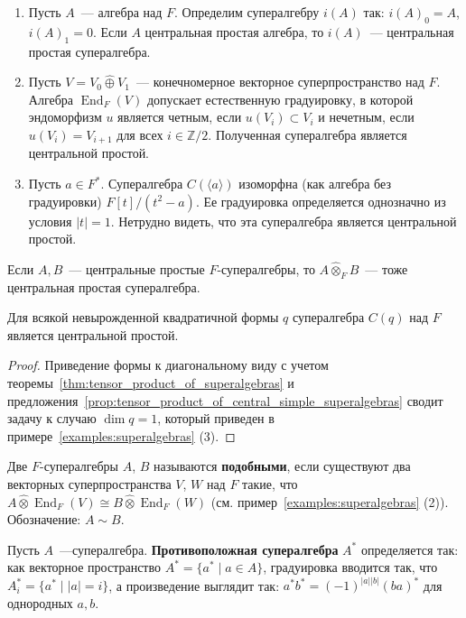 \documentclass[a4paper,oneside,12pt]{article}
\theoremstyle{plain} { \swapnumbers
\newtheorem{theorem}{Теорема}[subsection]
\newtheorem{corollary}[theorem]{Следствие}
\newtheorem{lemma}[theorem]{Лемма}
\newtheorem{proposition}[theorem]{Утверждение}
\newtheorem{claim}[theorem]{Факт}
}
\theoremstyle{definition} { \swapnumbers
\newtheorem{definition}[theorem]{Определение}
\newtheorem{notation}[theorem]{Обозначение}
\newtheorem{remark}[theorem]{Замечание}
\newtheorem{remarks}[theorem]{Замечания}
\newtheorem{example}[theorem]{Пример}
\newtheorem{examples}[theorem]{Примеры}
\newtheorem{sssection}[theorem]{}
}
\def\End{\operatorname{End}}
\def\la{\langle}
\def\ra{\rangle}
\begin{document}
\begin{examples}\label{examples:superalgebras}
\begin{enumerate}
\item Пусть $A$~--- алгебра над $F$. Определим супералгебру $i(A)$ так: $i(A)_0=A$, $i(A)_1=0$.
Если $A$ центральная простая алгебра, то $i(A)$~--- центральная простая супералгебра.
\item Пусть $V=V_0\hat\oplus V_1$~--- конечномерное векторное суперпространство над $F$. Алгебра
$\End_F(V)$ допускает естественную градуировку, в которой эндоморфизм $u$ является четным,
если $u(V_i)\subset V_i$ и нечетным, если $u(V_i)=V_{i+1}$ для всех $i\in\mathbb Z/2$.
Полученная супералгебра является центральной простой.
\item Пусть $a\in F^*$. Супералгебра $C(\la a\ra)$ изоморфна (как алгебра без градуировки)
$F[t]/(t^2-a)$. Ее градуировка определяется однозначно из условия $|t|=1$. Нетрудно видеть,
что эта супералгебра является центральной простой.
\end{enumerate}
\end{examples}

\begin{proposition}\label{prop:tensor_product_of_central_simple_superalgebras}
Если $A,B$~--- центральные простые $F$-супералгеб\-ры, то $A\hat\otimes_F B$~--- тоже
центральная простая супералгебра.
\end{proposition}

\begin{theorem}\label{thm:clifford_superalgebra_is_central_simple}
Для всякой невырожденной квадратичной формы $q$ супералгебра $C(q)$ над $F$ является центральной простой.
\end{theorem}
\begin{proof}
Приведение формы к диагональному виду с учетом теоремы~\ref{thm:tensor_product_of_superalgebras} и
предложения~\ref{prop:tensor_product_of_central_simple_superalgebras} сводит задачу к случаю $\dim q=1$,
который приведен в примере~\ref{examples:superalgebras} (3).
\end{proof}

\begin{definition}
Две $F$-супералгебры $A$, $B$ называются {\bf подобными}, если существуют два векторных
суперпространства $V$, $W$ над $F$ такие, что $A\hat\otimes\End_F(V)\cong B\hat\otimes\End_F(W)$
(см. пример~\ref{examples:superalgebras} (2)).
Обозначение: $A\sim B$.

Пусть $A$~---супералгебра. {\bf Противоположная супералгебра} $A^*$ определяется так:
как векторное пространство $A^*=\{a^*\mid a\in A\}$, градуировка вводится так, что
$A^*_i=\{a^*\mid |a|=i\}$, а произведение выглядит так: $a^*b^*=(-1)^{|a||b|}(ba)^*$
для однородных $a,b$.
\end{definition}
\end{document}
